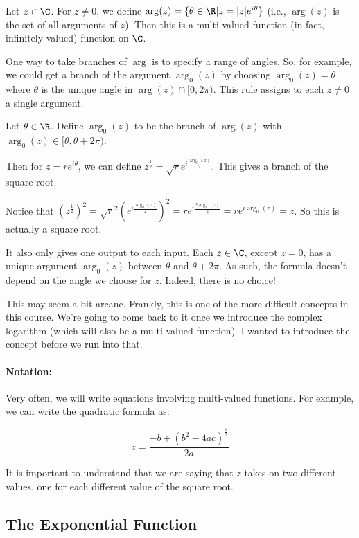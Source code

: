 \begin{ex}{}{} Let $z\in \C$. For $z\ne 0$, we define $\arg(z) = \{\theta\in \R| z = |z|e^{i\theta}\}$ (i.e., $\arg(z)$ is the set of all arguments of $z$). Then this is a multi-valued function (in fact, infinitely-valued) function on $\C$.

One way to take branches of $\arg$ is to specify a range of angles. So, for example, we could get a branch of the argument $\arg_0(z)$ by choosing $\arg_0(z) = \theta$ where $\theta$ is the unique angle in $\arg(z) \cap [0,2\pi)$. This rule assigns to each $z\ne 0$ a single argument.
\end{ex}

\begin{ex}{}{} Let $\theta \in \R$. Define $\arg_0(z)$ to be the branch of $\arg(z)$ with $\arg_0(z)\in [\theta, \theta + 2\pi)$.

Then for $z = re^{i\theta}$, we can define $z^{\frac{1}{2}} = \sqrt{r}e^{i\frac{\arg_0(z)}{2}}$. This gives a branch of the square root.

Notice that $(z^{\frac{1}{2}})^2 = \sqrt{r}^2(e^{i\frac{\arg_0(z)}{2}})^2 = re^{i\frac{2\arg_0(z)}{2}} = re^{i\arg_0(z)} = z$. So this is actually a square root.

It also only gives one output to each input. Each $z\in \C$, except $z = 0$, has a unique argument $\arg_0(z)$ between $\theta$ and $\theta + 2\pi$. As such, the formula doesn't depend on the angle we choose for $z$. Indeed, there is no choice!
\end{ex}

This may seem a bit arcane. Frankly, this is one of the more difficult concepts in this course. We're going to come back to it once we introduce the complex logarithm (which will also be a multi-valued function). I wanted to introduce the concept before we run into that.

\paragraph{Notation:} Very often, we will write equations involving multi-valued functions. For example, we can write the quadratic formula as:

$$z = \frac{-b+ (b^2 - 4ac)^\frac{1}{2}}{2a}$$

It is important to understand that we are saying that $z$ takes on two different values, one for each different value of the square root.


\subsection{The Exponential Function}

